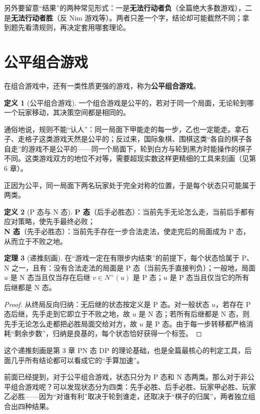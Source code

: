 \documentclass[UTF8,a4paper,11pt,oneside,openany,fontset=fandol]{ctexbook}
\theoremstyle{definition}
\newtheorem{definition}{定义}[chapter]
\newtheorem{theorem}[definition]{定理}
\newcommand{\Np}{N^+}
\begin{document}
另外要留意“结果”的两种常见形式：一是\textbf{无法行动者负}（全篇绝大多数游戏），二是\textbf{无法行动者胜}（反 Nim 游戏等）。两者只差一个字，结论却可能截然不同；拿到题先看清规则，再决定套用哪套理论。

\section{公平组合游戏}
在组合游戏中，还有一类性质更强的游戏，称为\textbf{公平组合游戏}。

\begin{definition}[公平组合游戏]
一个组合游戏是公平的，若对于同一个局面，无论轮到哪一个玩家移动，其决策空间都是相同的。
\end{definition}

通俗地说，规则不能“认人”：同一局面下甲能走的每一步，乙也一定能走。拿石子、走格子这类游戏天然是公平的；反过来，国际象棋、围棋这类“各自的棋子各自走”的游戏不是公平的——同一个局面下，轮到白方与轮到黑方时能操作的棋子不同。这类游戏双方的地位不对等，需要超现实数这样更精细的工具来刻画（见第 6 章）。

正因为公平，同一局面下两名玩家处于完全对称的位置，于是每个状态只可能属于两类。

\begin{definition}[P 态与 N 态]\label{def:pn}
\textbf{P 态}（后手必胜态）：当前先手无论怎么走，当前后手都有应对策略，使先手最终必败；\\
\textbf{N 态}（先手必胜态）：当前先手存在一步合法走法，使走完后的局面成为 P 态，从而立于不败之地。
\end{definition}

\begin{theorem}[递推刻画]\label{thm:recursion}
在“游戏一定在有限步内结束”的前提下，每个状态恰属于 P、N 之一，且有：没有合法走法的局面是 P 态（当前先手直接判负）；一般地，局面 $u$ 是 N 态当且仅当存在后继 $v\in\Np(u)$ 是 P 态；$u$ 是 P 态当且仅当它的所有后继都是 N 态。
\end{theorem}
\begin{proof}
从终局反向归纳：无后继的状态按定义是 P 态。对一般状态 $u$，若存在 P 态后继，先手走到它即立于不败之地，故 $u$ 是 N 态；若所有后继都是 N 态，则先手无论怎么走都把必胜局面交给对方，故 $u$ 是 P 态。由于每一步转移都严格消耗“剩余步数”，归纳是良基的，每个状态恰好获得一个标签。
\end{proof}

这个递推刻画是第 3 章 PN 态 DP 的理论基础，也是全篇最核心的判定工具，后面几乎所有结论都可以看成它的“手算加速”。

前面已经提到，对于公平组合游戏，状态只分为 P 态和 N 态两类。那么对于非公平组合游戏呢？可以发现状态分为四类：先手必胜、后手必胜、玩家甲必胜、玩家乙必胜——因为“对谁有利”取决于轮到谁走，还取决于“棋子的归属”，两者独立组合出四种结果。
\end{document}
